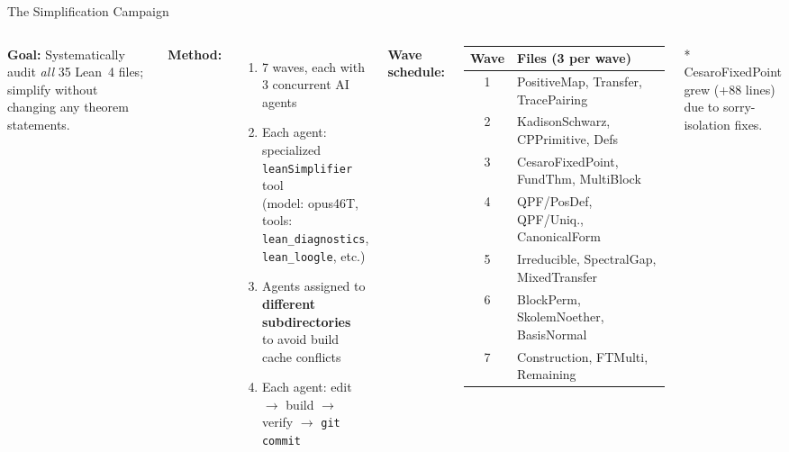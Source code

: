 \documentclass[aspectratio=169,10pt]{beamer}
\begin{document}
\begin{frame}{The Simplification Campaign}
    \vspace{-0.3em}
    \begin{columns}[T]
        \textbf{Goal:} Systematically audit \emph{all} 35 Lean~4 files;
        simplify without changing any theorem statements.

        \vspace{0.5em}
        \textbf{Method:}
        \begin{enumerate}\itemsep0.15em\small
            \item \textcolor{leangreen}{7 waves}, each with \textcolor{leangreen}{3 concurrent AI agents}
            \item Each agent: specialized \texttt{leanSimplifier} tool\\
                  {\tiny (model: opus46T, tools: \texttt{lean\_diagnostics}, \texttt{lean\_loogle}, etc.)}
            \item Agents assigned to \textbf{different subdirectories}\\
                  to avoid build cache conflicts
            \item Each agent: edit $\to$ build $\to$ verify $\to$ \texttt{git commit}
        \end{enumerate}

        \textbf{Wave schedule:}
        \vspace{0.2em}
        {\scriptsize
        \begin{tabular}{cl}
            \toprule
            \textbf{Wave} & \textbf{Files (3 per wave)} \\
            \midrule
            1 & PositiveMap, Transfer, TracePairing \\
            2 & KadisonSchwarz, CPPrimitive, Defs \\
            3 & CesaroFixedPoint, FundThm, MultiBlock \\
            4 & QPF/PosDef, QPF/Uniq., CanonicalForm \\
            5 & Irreducible, SpectralGap, MixedTransfer \\
            6 & BlockPerm, SkolemNoether, BasisNormal \\
            7 & Construction, FTMulti, Remaining \\
            \bottomrule
        \end{tabular}
        }
        \vspace{0.3em}

        {\scriptsize\textcolor{dimwhite}{* CesaroFixedPoint grew (+88 lines) due to sorry-isolation fixes.}}
    \end{columns}
\end{frame}
\end{document}

